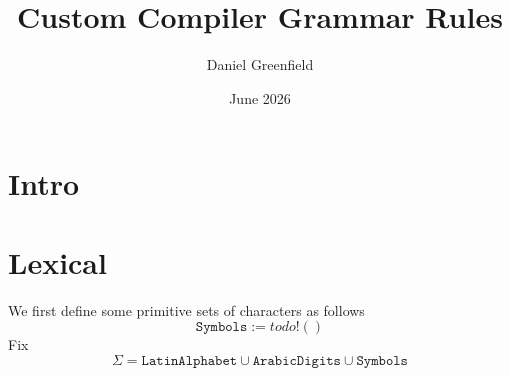 \documentclass{article}
\title{Custom Compiler Grammar Rules}
\author{Daniel Greenfield}
\date{June 2026}
\begin{document}
\maketitle
\section{Intro}


\section{Lexical}
We first define some primitive sets of characters as follows
$$
\texttt{Symbols} := todo!()
$$
Fix 
\[
\Sigma = \texttt{LatinAlphabet} \cup \texttt{ArabicDigits} \cup \texttt{Symbols}
\]
\end{document}

